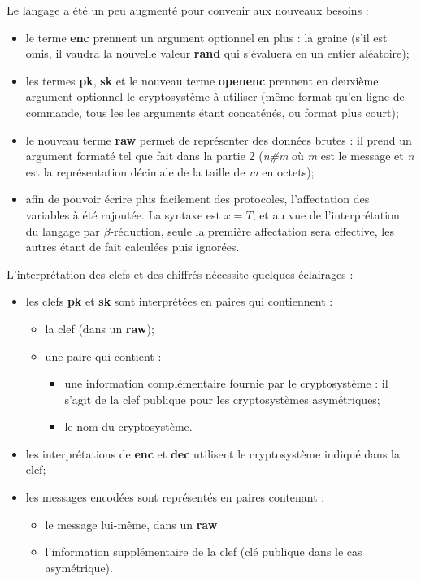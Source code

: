 \documentclass[11pt]{article} %
\begin{document}
Le langage a été un peu augmenté pour convenir aux nouveaux besoins :
\begin{itemize}
  \item le terme \textbf{enc} prennent un argument optionnel en plus : la graine (s'il est omis, il vaudra la nouvelle valeur \textbf{rand} qui s'évaluera en un entier aléatoire);
  \item les termes \textbf{pk}, \textbf{sk} et le nouveau terme \textbf{openenc} prennent en deuxième argument optionnel le cryptosystème à utiliser (même format qu'en ligne de commande, tous les les arguments étant concaténés, ou format plus court);
  \item le nouveau terme \textbf{raw} permet de représenter des données brutes : il prend un argument formaté tel que fait dans la partie 2 (\emph{n\#m} où \emph{m} est le message et \emph{n} est la représentation décimale de la taille de \emph{m} en octets);
  \item afin de pouvoir écrire plus facilement des protocoles, l'affectation des variables à été rajoutée. La syntaxe est $x=T$, et au vue de l'interprétation du langage par $\beta$-réduction, seule la première affectation sera effective, les autres étant de fait calculées puis ignorées.
\end{itemize}

L'interprétation des clefs et des chiffrés nécessite quelques éclairages :
\begin{itemize}
  \item les clefs \textbf{pk} et \textbf{sk} sont interprétées en paires qui contiennent :
  \begin{itemize}
    \item la clef (dans un \textbf{raw});
    \item une paire qui contient :
    \begin{itemize}
      \item une information complémentaire fournie par le cryptosystème : il s'agit de la clef publique pour les cryptosystèmes asymétriques;
      \item le nom du cryptosystème.
    \end{itemize}
  \end{itemize}
  \item les interprétations de \textbf{enc} et \textbf{dec} utilisent le cryptosystème indiqué dans la clef;
  \item les messages encodées sont représentés en paires contenant :
  \begin{itemize}
  \item le message lui-même, dans un \textbf{raw}
  \item l'information supplémentaire de la clef (clé publique dans le cas asymétrique).
  \end{itemize}
\end{itemize}
\end{document}

